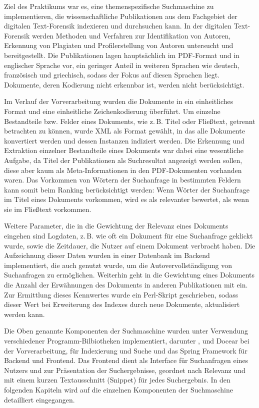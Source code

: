 Ziel des Praktikums war es, eine themenspezifische Suchmaschine zu
implementieren, die wissenschaftliche Publikationen aus dem Fachgebiet
der digitalen Text-Forensik indexieren und durchsuchen kann. In der
digitalen Text-Forensik werden Methoden und Verfahren zur
Identifikation von Autoren, Erkennung von Plagiaten und
Profilerstellung von Autoren untersucht und bereitgestellt. Die
Publikationen lagen hauptsächlich im PDF-Format und in englischer
Sprache vor, ein geringer Anteil in weiteren Sprachen wie deutsch, französisch und griechisch, sodass der Fokus auf diesen Sprachen liegt. Dokumente, deren Kodierung nicht erkennbar ist, werden nicht
berücksichtigt. 

Im Verlauf der Vorverarbeitung wurden die Dokumente in ein
einheitliches Format und eine einheitliche Zeichenkodierung überführt.
Um einzelne Bestandteile bzw. Felder eines Dokuments, wie z.\,B. Titel
oder Fließtext, getrennt betrachten zu können, wurde XML als Format
gewählt, in das alle Dokumente konvertiert werden und dessen Instanzen
indiziert werden.  Die Erkennung und Extraktion einzelner Bestandteile eines
Dokuments war dabei eine wesentliche Aufgabe, da Titel der
Publikationen als Suchresultat angezeigt werden sollen, diese aber
kaum als Meta-Informationen in den PDF-Dokumenten vorhanden waren.
Das Vorkommen von Wörtern der Suchanfrage in bestimmten Feldern kann
somit beim Ranking berücksichtigt werden: Wenn Wörter der Suchanfrage
im Titel eines Dokuments vorkommen, wird es als relevanter bewertet,
als wenn sie im Fließtext vorkommen.

Weitere Parameter, die in die Gewichtung der Relevanz eines Dokuments
eingehen sind Logdaten, z.\,B. wie oft ein Dokument für eine Suchanfrage
geklickt wurde, sowie die Zeitdauer, die Nutzer auf einem Dokument
verbracht haben.  Die Aufzeichnung dieser Daten wurden in einer
Datenbank im Backend implementiert, die auch genutzt wurde, um die
Autovervollständigung von Suchanfragen zu ermöglichen.  Weiterhin geht
in die Gewichtung eines Dokuments die Anzahl der Erwähnungen des
Dokuments in anderen Publikationen mit ein.  Zur Ermittlung dieses
Kennwertes wurde ein Perl-Skript geschrieben, sodass dieser Wert bei
Erweiterung des Indexes durch neue Dokumente, aktualisiert werden
kann.

Die Oben genannte Komponenten der Suchmaschine wurden unter Verwendung
verschiedener Programm-Bilbiotheken implementiert, darunter \pdfbox,
\tika und Docear bei der Vorverarbeitung, \lucene für
Indexierung und Suche und das Spring Framework für Backend und
Frontend.  Das Frontend dient als Interface für Suchanfragen eines
Nutzers und zur Präsentation der Suchergebnisse, geordnet nach
Relevanz und mit einem kurzen Textausschnitt (Snippet) für jedes
Suchergebnis.  In den folgenden Kapiteln wird auf die einzelnen
Komponenten der Suchmaschine detailliert eingegangen.

